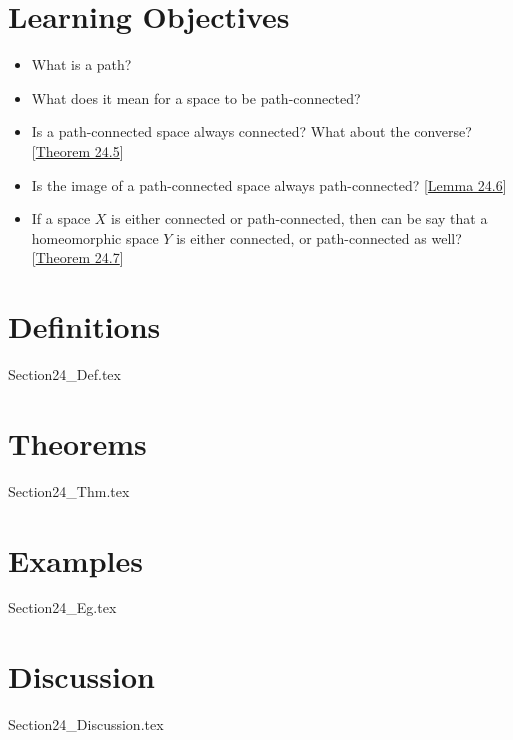 \section{Learning Objectives}

\begin{itemize}
    \item What is a path?
    \item What does it mean for a space to be path-connected?
    \item Is a path-connected space always connected? What about the converse?
        [\hyperlink{thm:24.5}{Theorem 24.5}] 
    \item Is the image of a path-connected space always path-connected? 
        [\hyperlink{thm:24.6}{Lemma 24.6}]
    \item If a space \( X \) is either connected or path-connected, then can be 
        say that a homeomorphic space \( Y \) is either connected, or 
        path-connected as well? [\hyperlink{thm:24.7}{Theorem 24.7}]
\end{itemize}

\section{Definitions}

{Section24_Def.tex}

\section{Theorems}

{Section24_Thm.tex}

\section{Examples}

{Section24_Eg.tex}

\section{Discussion}

{Section24_Discussion.tex}